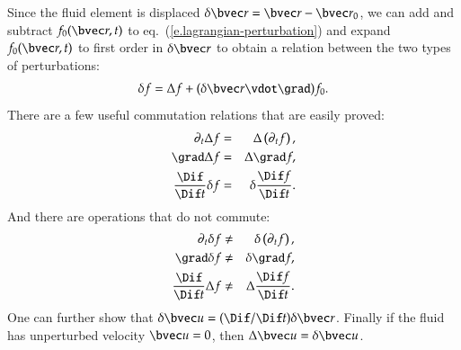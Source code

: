 Since the fluid element is displaced $\delta\vr = \vr-\vr_{0}$, we can add and subtract $f_{0}(\vr,t)$ to eq.~(\ref{e.lagrangian-perturbation}) and expand $f_{0}(\vr,t)$ to first order in $\delta \vr$ to obtain a relation between the two types of perturbations:
\begin{equation}\label{e.perturbation-relation}
\delta f = \Delta f + (\delta\vr\vdot\grad)f_{0}.
\end{equation}
There are a few useful commutation relations that are easily proved:
\begin{eqnarray}
\partial_{t}\Delta f &=& \Delta\left(\partial_{t}f\right),\\
\grad \Delta f &=& \Delta \grad f,\\
\frac{\Dif}{\Dif t}\delta f &=& \delta \frac{\Dif f}{\Dif t}.
\end{eqnarray}
And there are operations that do not commute:
\begin{eqnarray}
\partial_{t}\delta f &\neq& \delta\left(\partial_{t}f\right),\\
\grad \delta f &\neq& \delta \grad f,\\
\frac{\Dif}{\Dif t}\Delta f &\neq& \Delta \frac{\Dif f}{\Dif t}.
\end{eqnarray}
One can further show that $\delta\vu = (\Dif/\Dif t)\delta \vr$. Finally if the fluid has unperturbed velocity $\vu = 0$, then $\Delta \vu = \delta \vu$.

